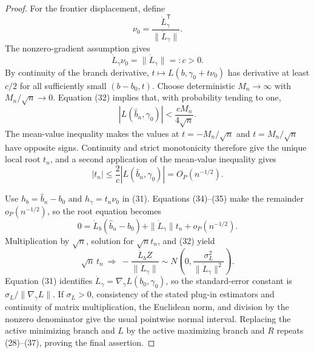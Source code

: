 \documentclass{article}
\begin{document}
\begin{proof}
For the frontier displacement, define
\[
 \nu_0=\frac{\dot L_\gamma^{\mathsf T}}{\|\dot L_\gamma\|}.
\]
The nonzero-gradient assumption gives
\[
 \dot L_\gamma\nu_0=\|\dot L_\gamma\|=:c>0.                         \tag{34}
\]
By continuity of the branch derivative, \(t\mapsto L(b,\gamma_0+t\nu_0)\) has derivative at least \(c/2\) for all sufficiently small \((b-b_0,t)\).  Choose deterministic \(M_n\to\infty\) with \(M_n/\sqrt n\to0\).  Equation (32) implies that, with probability tending to one,
\[
 |L(\widehat b_n,\gamma_0)|<\frac{cM_n}{4\sqrt n}.
\]
The mean-value inequality makes the values at \(t=-M_n/\sqrt n\) and \(t=M_n/\sqrt n\) have opposite signs.  Continuity and strict monotonicity therefore give the unique local root \(t_n\), and a second application of the mean-value inequality gives
\[
 |t_n|\leq\frac{2}{c}|L(\widehat b_n,\gamma_0)|=O_P(n^{-1/2}).          \tag{35}
\]

Use \(h_b=\widehat b_n-b_0\) and \(h_\gamma=t_n\nu_0\) in (31).  Equations (34)--(35) make the remainder \(o_P(n^{-1/2})\), so the root equation becomes
\[
 0=\dot L_b(\widehat b_n-b_0)+\|\dot L_\gamma\|t_n+o_P(n^{-1/2}).     \tag{36}
\]
Multiplication by \(\sqrt n\), solution for \(\sqrt n t_n\), and (32) yield
\[
 \sqrt n\,t_n
 \ \Longrightarrow\
 -\frac{\dot L_bZ}{\|\dot L_\gamma\|}
 \sim N\!\left(0,\frac{\sigma_L^2}{\|\dot L_\gamma\|^2}\right).    \tag{37}
\]
Equation (31) identifies \(\dot L_\gamma=\nabla_\gamma L(b_0,\gamma_0)\), so the standard-error constant is \(\sigma_L/\|\nabla_\gamma L\|\).  If \(\sigma_L>0\), consistency of the stated plug-in estimators and continuity of matrix multiplication, the Euclidean norm, and division by the nonzero denominator give the usual pointwise normal interval.  Replacing the active minimizing branch and \(L\) by the active maximizing branch and \(R\) repeats (28)--(37), proving the final assertion.
\end{proof}
\end{document}
